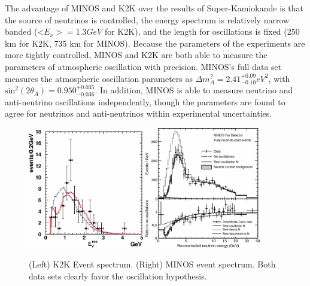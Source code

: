 The advantage of MINOS and K2K over the results of Super-Kamiokande is that the source of neutrinos is controlled, the energy spectrum is relatively narrow banded (<$E_\nu> = 1.3 GeV$ for K2K), and the length for oscillations is fixed (250 km for K2K, 735 km for MINOS).  Because the parameters of the experiments are more tightly controlled, MINOS and K2K are both able to measure the parameters of atmospheric oscillation with precision.  MINOS's full data set \cite{PhysRevD.86.052007} measures the atmospheric oscillation parameters as $\Delta m^2_A = 2.41^{+0.09}_{-0.10} eV^2$, with $\text{sin}^2(2\theta_A) = 0.950^{+0.035}_{-0.036}$.  In addition, MINOS is able to measure neutrino and anti-neutrino oscillations independently, though the parameters are found to agree for neutrinos and anti-neutrinos within experimental uncertainties.

\begin{figure}[htbp]
  \centering
  \includegraphics[width=0.45\textwidth]{intro_figures/k2k_oscillations.png}
  \includegraphics[width=0.45\textwidth]{intro_figures/minos_oscillations.png}
  \caption[MINOS and K2K \numu Oscillations]{(Left) K2K Event spectrum. (Right) MINOS event spectrum.  Both data sets clearly favor the oscillation hypothesis.}
  \label{fig:label}
\end{figure}

